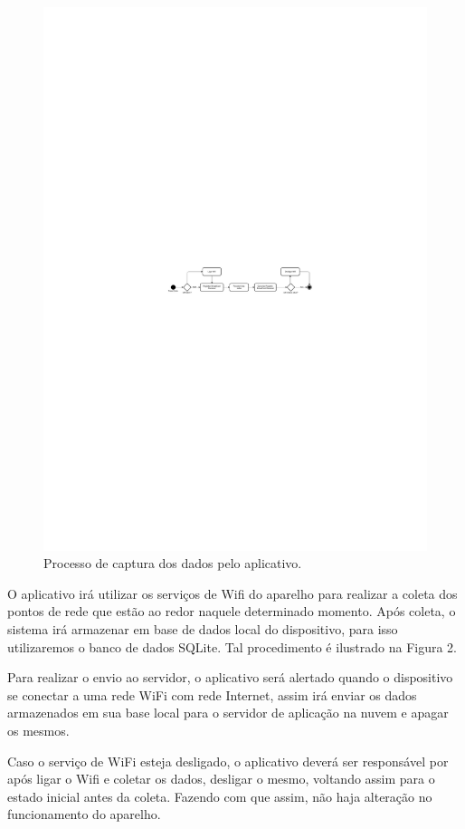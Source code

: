 \documentclass[12pt, %
openright, 
oneside,
a4paper,
brazil]{facom-ufu-abntex2}
\begin{document}
\begin{figure}[hbt]
  \includegraphics [scale=.4] {pherocast1}
  \caption{Processo de captura dos dados pelo aplicativo.}
\end{figure}

O aplicativo irá utilizar os serviços de Wifi do aparelho para realizar a coleta dos pontos de rede que estão ao redor naquele determinado momento. Após coleta, o sistema irá armazenar em base de dados local do dispositivo, para isso utilizaremos o banco de dados SQLite. Tal procedimento é ilustrado na Figura 2.

Para realizar o envio ao servidor, o aplicativo será alertado quando o dispositivo se conectar a uma rede WiFi com rede Internet, assim irá enviar os dados armazenados em sua base local para o servidor de aplicação na nuvem e apagar os mesmos. 

Caso o serviço de WiFi esteja desligado, o aplicativo deverá ser responsável por após ligar o Wifi e coletar os dados, desligar o mesmo, voltando assim para o estado inicial antes da coleta. Fazendo com que assim, não haja alteração no funcionamento do aparelho.
\end{document}
